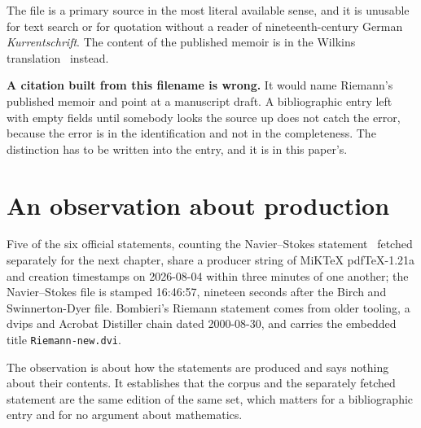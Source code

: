 The file is a primary source in the most literal available sense, and it is unusable for text search
or for quotation without a reader of nineteenth-century German \emph{Kurrentschrift}. The content of
the published memoir is in the Wilkins translation~\cite{src:Wilkins-1998} instead.

\textbf{A citation built from this filename is wrong.} It would name Riemann's published memoir and
point at a manuscript draft. A bibliographic entry left with empty fields until somebody looks the
source up does not catch the error, because the error is in the identification and not in the
completeness. The distinction has to be written into the entry, and it is in this paper's.

\section{An observation about production}

Five of the six official statements, counting the Navier--Stokes statement~\cite{src:Fefferman}
fetched separately for the next chapter, share a producer string of MiKTeX pdfTeX-1.21a and creation
timestamps on 2026-08-04 within three minutes of one another; the Navier--Stokes file is stamped
16:46:57, nineteen seconds after the Birch and Swinnerton-Dyer file. Bombieri's Riemann statement
comes from older tooling, a dvips and Acrobat Distiller chain dated 2000-08-30, and carries the
embedded title \texttt{Riemann-new.dvi}.

The observation is about how the statements are produced and says nothing about their contents. It
establishes that the corpus and the separately fetched statement are the same edition of the same
set, which matters for a bibliographic entry and for no argument about mathematics.
